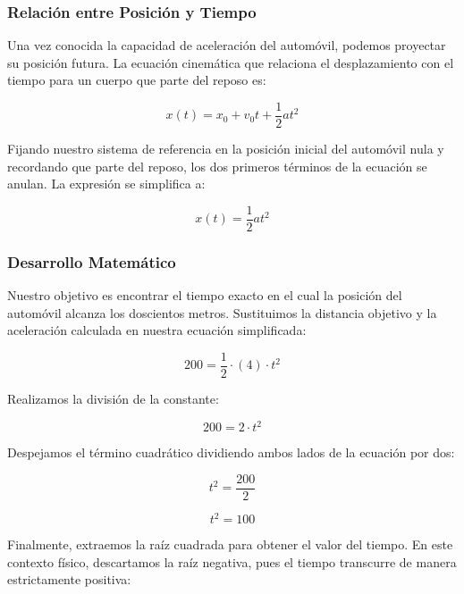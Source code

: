 \documentclass[12pt, a4paper]{article}
\begin{document}
\subsubsection*{Relación entre Posición y Tiempo}

Una vez conocida la capacidad de aceleración del automóvil, podemos proyectar su posición futura. La ecuación cinemática que relaciona el desplazamiento con el tiempo para un cuerpo que parte del reposo es:

\begin{equation}
x(t) = x_0 + v_0 t + \frac{1}{2} a t^2
\end{equation}

Fijando nuestro sistema de referencia en la posición inicial del automóvil nula y recordando que parte del reposo, los dos primeros términos de la ecuación se anulan. La expresión se simplifica a:

\begin{equation}
x(t) = \frac{1}{2} a t^2
\end{equation}

\subsubsection*{Desarrollo Matemático}

Nuestro objetivo es encontrar el tiempo exacto en el cual la posición del automóvil alcanza los doscientos metros. Sustituimos la distancia objetivo y la aceleración calculada en nuestra ecuación simplificada:

\begin{equation}
200 = \frac{1}{2} \cdot (4) \cdot t^2
\end{equation}

Realizamos la división de la constante:

\begin{equation}
200 = 2 \cdot t^2
\end{equation}

Despejamos el término cuadrático dividiendo ambos lados de la ecuación por dos:

\begin{equation}
t^2 = \frac{200}{2}
\end{equation}

\begin{equation}
t^2 = 100
\end{equation}

Finalmente, extraemos la raíz cuadrada para obtener el valor del tiempo. En este contexto físico, descartamos la raíz negativa, pues el tiempo transcurre de manera estrictamente positiva:
\end{document}
